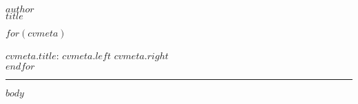 \documentclass[10pt, A4]{article}
\newcommand{\metasection}[2]
{
	\footnotesize{#2} \hspace*{\fill} \footnotesize{#1}\\[1pt]
}
\newcommand{\mystrut}{\rule[-.3\baselineskip]{0pt}{\baselineskip}}
\begin{document}
\pagestyle{fancy}

\vspace{-8pt}
\begin{center}
	\HUGE \textsc{$author$}\\[2pt]
	\small $title$
\end{center}
\vspace{6pt}

$for(cvmeta)$
  \metasection{$cvmeta.right$}{\textbf{$cvmeta.title$}: $cvmeta.left$}
$endfor$
\vspace{-2pt}
\textcolor{softcol}{\hrule}
\vspace{6pt}
\normalsize
\vspace{-6pt}
$body$

\null
\vspace*{\fill}
\hspace{-0.25\linewidth}\colorbox{white}{\makebox[1.5\linewidth][c]{\mystrut
		\textnormal{\textcolor{sectcol}{$cvfooter.left$} -
		\textcolor{sectcol}{$cvfooter.right$}}}
}
\end{document}

